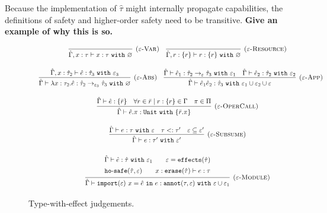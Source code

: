 Because the implementation of $\hat \tau$ might internally propagate capabilities, the definitions of safety and higher-order safety need to be transitive. \textbf{Give an example of why this is so.}



\begin{figure}[h]


\noindent
{}

\[
\begin{array}{c}

\infer[\textsc{($\varepsilon$-Var)}]
	{ \hat \Gamma, x:\tau \vdash x: \tau~\kw{with} \varnothing }
	{}
	
	~~~
	
\infer[\textsc{($\varepsilon$-Resource)}]
 	{ \hat \Gamma, r: \{ r \} \vdash r : \{ r \}~\kw{with} \varnothing }
 	{} \\[3ex]
 	
 	~~~
	\infer[\textsc{($\varepsilon$-Abs)}]
	{ \hat \Gamma \vdash \lambda x:\tau_2 . \hat e : \hat \tau_2 \rightarrow_{\varepsilon_3} \hat \tau_3~\kw{with} \varnothing }
	{ \hat \Gamma, x: \hat \tau_2 \vdash \hat e: \hat \tau_3~\kw{with} \varepsilon_3 }
	
	~~~
	
\infer[\textsc{($\varepsilon$-App)}]
	{ \hat \Gamma \vdash \hat e_1 \hat e_2 : \hat \tau_3~\kw{with} \varepsilon_1 \cup \varepsilon_2 \cup \varepsilon  }
	{ \hat \Gamma \vdash \hat e_1: \hat \tau_2 \rightarrow_{\varepsilon} \hat \tau_3~\kw{with} \varepsilon_1 & \hat \Gamma \vdash \hat e_2: \hat \tau_2~\kw{with} \varepsilon_2 } \\[3ex]
	
\infer[\textsc{($\varepsilon$-OperCall)}]
	{ \hat \Gamma \vdash \hat e.\pi: \kw{Unit} \kw{with} \{ \bar r.\pi \} }
	{ \hat \Gamma \vdash \hat e: \{ \bar r \} & \forall r \in \bar r \mid r: \{ r \} \in \Gamma & \pi \in \Pi } \\[3ex]

\infer[\textsc{($\varepsilon$-Subsume)}]
	{ \hat \Gamma \vdash e: \tau' ~\kw{with} \varepsilon'}
	{ \hat \Gamma \vdash e: \tau ~\kw{with} \varepsilon & \tau <: \tau' & \varepsilon \subseteq \varepsilon'}  \\[3ex]

\infer[\textsc{($\varepsilon$-Module)}]
	{ \hat \Gamma \vdash \kwa{import}(\varepsilon)~x = \hat e~\kw{in} e: \kwa{annot}(\tau, \varepsilon)~\kw{with} \varepsilon \cup \varepsilon_1 }
{{\def\arraystretch{1.4}
  \begin{array}{c}
\hat \Gamma \vdash \hat e: \hat \tau~\kw{with} \varepsilon_1
~~~~~~
\varepsilon = \kwa{effects}(\hat \tau) \\
\kwa{ho \hyphen safe}(\hat \tau, \varepsilon) ~~~~~~ x: \kwa{erase}(\hat \tau) \vdash e: \tau
  \end{array}}} 
 
\end{array}
\]


\vspace{-7pt}
\caption{Type-with-effect judgements.}
\label{This is the label.}
\end{figure}

